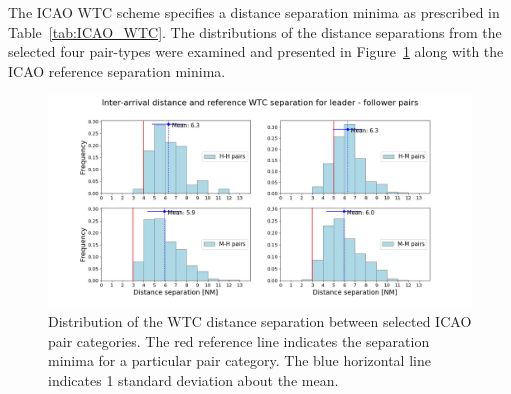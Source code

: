\begin{table}[h]
\centering
{}
\caption[BIKF traffic mix sorted into ICAO WTC]{Number of ICAO pairs from the traffic mix at BIKF during peak hours, arranged into the corresponding wake categories. The observation period is from October 2017 to November 2018.}
\label{tab:pairs_mix_to_wtc}
\end{table}

The ICAO WTC scheme specifies a distance separation minima as prescribed in  Table~\ref{tab:ICAO_WTC}. The distributions of the distance separations from the selected four pair-types were examined and presented in Figure~\ref{fig:dist_separ_HH_HM_MH_MM_pairs} along with the ICAO reference separation minima. 

\begin{figure}[h]
    \centering
    \includegraphics[width=1\textwidth]{graphics/fig_dist_separ_HH_HM_MH_MM_pairs.png}
    \caption[Distribution of distance separation for ICAO pairs]{Distribution of the WTC distance separation between selected ICAO pair categories. The red reference line indicates the separation minima for a particular pair category. The blue horizontal line indicates 1 standard deviation about the mean.}
    \label{fig:dist_separ_HH_HM_MH_MM_pairs}
\end{figure}

